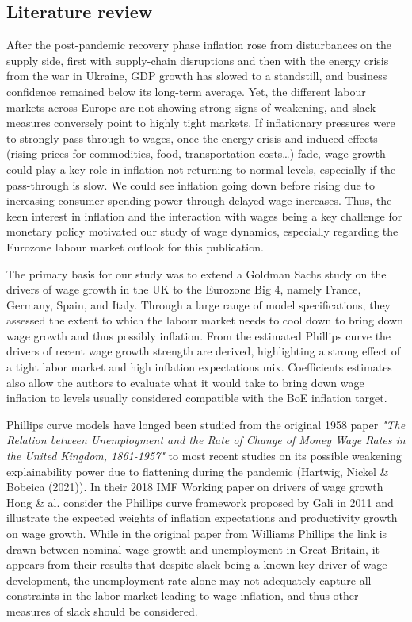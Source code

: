 \subsection{Literature review}

\quad After the post-pandemic recovery phase inflation rose from disturbances on the supply side, first with supply-chain disruptions and then with the energy crisis from the war in Ukraine, GDP growth has slowed to a standstill, and business confidence remained below its long-term average. 
Yet, the different labour markets across Europe are not showing strong signs of weakening, and slack measures conversely point to highly tight markets. 
If inflationary pressures were to strongly pass-through to wages, once the energy crisis and induced effects (rising prices for commodities, food, transportation costs\dots) fade, wage growth could play a key role in inflation not returning to normal levels, especially if the pass-through is slow. 
We could see inflation going down before rising due to increasing consumer spending power through delayed wage increases. Thus, the keen interest in inflation and the interaction with wages being a key challenge for monetary policy motivated our study of wage dynamics, especially regarding the Eurozone labour market outlook for this publication. 

The primary basis for our study was to extend a Goldman Sachs study on the drivers of wage growth in the UK to the Eurozone Big 4, namely France, Germany, Spain, and Italy. 
Through a large range of model specifications, they assessed the extent to which the labour market needs to cool down to bring down wage growth and thus possibly inflation.
From the estimated Phillips curve the drivers of recent wage growth strength are derived, highlighting a strong effect of a tight labor market and high inflation expectations mix.
Coefficients estimates also allow the authors to evaluate what it would take to bring down wage inflation to levels usually considered compatible with the BoE inflation target.

Phillips curve models have longed been studied from the original 1958 paper \textit{"The Relation between Unemployment and the Rate of Change of Money Wage Rates in the United Kingdom, 1861-1957"} to most recent studies on its possible weakening explainability power due to flattening during the pandemic (Hartwig, Nickel \& Bobeica (2021)). 
In their 2018 IMF Working paper on drivers of wage growth Hong \& al. consider the Phillips curve framework proposed by Gali in 2011 and illustrate the expected weights of inflation expectations and productivity growth on wage growth. 
While in the original paper from Williams Phillips the link is drawn between nominal wage growth and unemployment in Great Britain, it appears from their results that despite slack being a known key driver of wage development, the unemployment rate alone may not adequately capture all constraints in the labor market leading to wage inflation, and thus other measures of slack should be considered.


